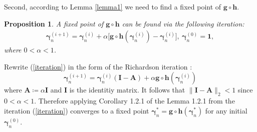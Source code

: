 \documentclass[journal,10pt,onecolumn,draftclsnofoot,]{IEEEtran}
\makeatletter
\theoremstyle{plain}
\newtheorem{proposition}{Proposition}
\theoremstyle{definition}
\theoremstyle{remark}
\renewenvironment{proof}[1][\proofname]{\par
  \pushQED{\qed}%
  \normalfont \topsep6\p@\@plus6\p@\relax
  \list{}{%
    \settowidth{\leftmargin}{\itshape\proofname:\hskip\labelsep}%
    \setlength{\labelwidth}{0pt}%
    \setlength{\itemindent}{-\leftmargin}%
  }%
  \item[\hskip\labelsep\itshape#1\@addpunct{:}]\ignorespaces
}{%
  \popQED\endlist\@endpefalse
}
\makeatother
\begin{document}
Second, according to Lemma \ref{lemma1} we need to find a fixed point of $\bm{g} \circ \bm{h}$. 
\begin{proposition}
A fixed point of $\bm{g} \circ \bm{h}$ can be found via the following iteration:
\begin{equation}
\begin{split} 
\bm{\gamma}_{n}^{(i+1)} = \bm{\gamma}_{n}^{(i)} + \alpha\Big[\bm{g} \circ \bm{h}( \bm{\gamma}_{n}^{(i)} ) - \bm{\gamma}_{n}^{(i)}\Big], ~\bm{\gamma}_{n}^{(0)} = \bm{1}, 
\end{split}
\label{iteration}
\end{equation}
where $0 < \alpha < 1$.
\end{proposition}
\begin{proof}
  Rewrite (\ref{iteration}) in the form of the Richardson iteration \cite{kelleyiterative}:
  \begin{equation*}
    \bm{\gamma}_{n}^{(i+1)} = \bm{\gamma}_{n}^{(i)} (\bm{I} - \bm{A}) + \alpha \bm{g} \circ \bm{h}( \bm{\gamma}_{n}^{(i)})
  \end{equation*}
  where $\bm{A} \coloneqq \alpha \bm{I}$ and $\bm{I}$ is the identitiy matrix. 
  It follows that $\|\bm{I} - \bm{A}\|_2 < 1$ since $0 < \alpha < 1$. Therefore applying Corollary 1.2.1 of the Lemma 1.2.1 from \cite{kelleyiterative} the iteration (\ref{iteration}) converges to a fixed point $\bm{\gamma}_{n}^{*} = \bm{g} \circ \bm{h}( \bm{\gamma}_{n}^{*})$ for any initial $\bm{\gamma}_{n}^{(0)}$.
\end{proof}
\end{document}
